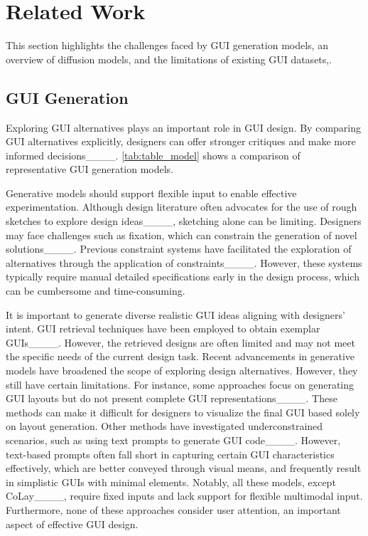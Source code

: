 \section{Related Work}
This section highlights the challenges faced by GUI generation models, an overview of diffusion models, and the limitations of existing GUI datasets,.



\subsection{GUI Generation}

Exploring GUI alternatives plays an important role in GUI design.   By comparing GUI alternatives explicitly, designers can offer stronger critiques and make more informed decisions____. \autoref{tab:table_model} shows a comparison of representative GUI generation models. 


Generative models should support flexible input to enable effective experimentation. Although design literature often advocates for the use of rough sketches to explore design ideas____, sketching alone can be limiting. Designers may face challenges such as fixation, which can constrain the generation of novel solutions____. Previous constraint systems have facilitated the exploration of alternatives through the application of constraints____. However, these systems typically require manual detailed specifications early in the design process, which can be cumbersome and time-consuming.


It is important to generate diverse realistic GUI ideas aligning with designers' intent. 
GUI retrieval techniques have been employed to obtain exemplar GUIs____. However, the retrieved designs are often limited and may not meet the specific needs of the current design task. Recent advancements in generative models have broadened the scope of exploring design alternatives. However, they still have certain limitations. For instance, some approaches focus on generating GUI layouts but do not present complete GUI representations____. These methods can make it difficult for designers to visualize the final GUI based solely on layout generation. Other methods have investigated underconstrained scenarios, such as using text prompts to generate GUI code____. However, text-based prompts often fall short in capturing certain GUI characteristics effectively, which are better conveyed through visual means, and frequently result in simplistic GUIs with minimal elements. Notably, all these models, except CoLay____, require fixed inputs and lack support for flexible multimodal input. Furthermore, none of these approaches consider user attention, an important aspect of effective GUI design.


